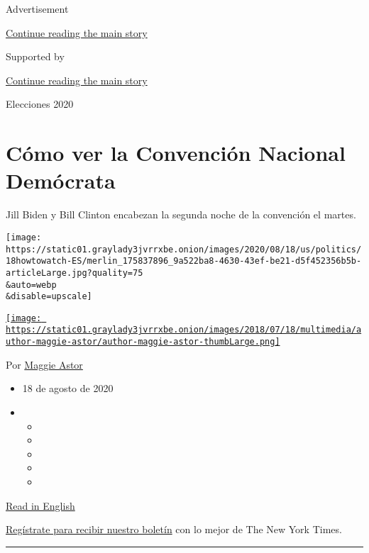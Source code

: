 Advertisement

\protect\hyperlink{after-top}{Continue reading the main story}

Supported by

\protect\hyperlink{after-sponsor}{Continue reading the main story}

Elecciones 2020

\hypertarget{cuxf3mo-ver-la-convenciuxf3n-nacional-demuxf3crata}{%
\section{Cómo ver la Convención Nacional
Demócrata}\label{cuxf3mo-ver-la-convenciuxf3n-nacional-demuxf3crata}}

Jill Biden y Bill Clinton encabezan la segunda noche de la convención el
martes.

\texttt{[image: https://static01.graylady3jvrrxbe.onion/images/2020/08/18/us/politics/18howtowatch-ES/merlin\_175837896\_9a522ba8-4630-43ef-be21-d5f452356b5b-articleLarge.jpg?quality=75\\\&auto=webp\\\&disable=upscale]}

\href{https://www.nytimes3xbfgragh.onion/by/maggie-astor}{\texttt{[image: https://static01.graylady3jvrrxbe.onion/images/2018/07/18/multimedia/author-maggie-astor/author-maggie-astor-thumbLarge.png]}}

Por \href{https://www.nytimes3xbfgragh.onion/by/maggie-astor}{Maggie
Astor}

\begin{itemize}
\item
  18 de agosto de 2020
\item
  \begin{itemize}
  \item
  \item
  \item
  \item
  \item
  \end{itemize}
\end{itemize}

\href{https://www.nytimes3xbfgragh.onion/2020/08/18/us/politics/speakers-dnc-schedule.html}{Read
in English}

\href{https://www.nytimes3xbfgragh.onion/newsletters/el-times}{Regístrate
para recibir nuestro boletín} con lo mejor de The New York Times.

\begin{center}\rule{0.5\linewidth}{\linethickness}\end{center}

